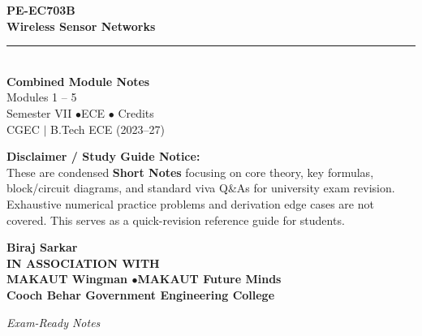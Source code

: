 \documentclass[12pt,a4paper]{article}
\begin{document}
\thispagestyle{empty}


\vspace*{1.0cm}
\begin{center}
  {\Huge\bfseries\color{myred} PE-EC703B}\\[10pt]
  {\LARGE\bfseries\color{mydark} Wireless Sensor Networks}\\[20pt]
  {\color{myred}\rule{0.7\linewidth}{1.5pt}}\\[18pt]
  {\Large\color{myteal}\textbf{Combined Module Notes}}\\[8pt]
  {\large\color{mydark} Modules 1 -- 5}\\[40pt]
  {\normalsize\color{mydark} Semester VII \quad$\bullet$\quad ECE \quad$\bullet$ Credits}\\[12pt]
  {\normalsize\color{mydark} CGEC \;$|$\; B.Tech ECE (2023--27)}
\end{center}
\vspace{1.0cm}
\begin{center}
  \begin{tcolorbox}[colback=mygray, colframe=mgframe, boxrule=0.5pt, arc=3pt, width=0.85\linewidth]
    \centering\small\color{mydark}
    \textbf{Disclaimer / Study Guide Notice:}\\
    These are condensed \textbf{Short Notes} focusing on core theory, key formulas, block/circuit diagrams, and standard viva Q\&As for university exam revision. Exhaustive numerical practice problems and derivation edge cases are not covered. This serves as a quick-revision reference guide for students.
  \end{tcolorbox}
\end{center}
\vfill
\vspace{0.6cm}
\begin{center}
  {\large\bfseries\color{mypurple} Biraj Sarkar}\\[16pt]
  {\footnotesize\color{watermark}\textbf{IN ASSOCIATION WITH}}\\[8pt]
  {\small\bfseries\color{mydark} MAKAUT Wingman \quad$\bullet$\quad MAKAUT Future Minds}\\[12pt]
  {\large\bfseries\color{myteal} Cooch Behar Government Engineering College}
\end{center}
\vfill
\begin{center}{\small\color{watermark}\textit{Exam-Ready Notes}}\end{center}
\clearpage
\end{document}
